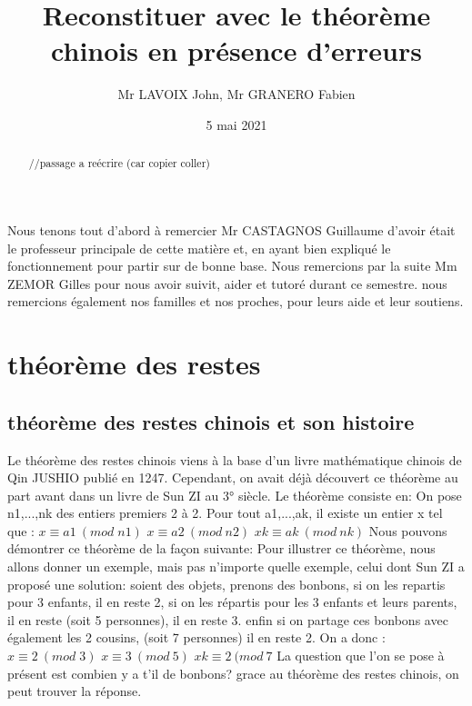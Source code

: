 \documentclass[a4paper, 11pt]{article}
\begin{document}
\title{Reconstituer avec le théorème chinois en présence d’erreurs}
\author{Mr LAVOIX John, Mr GRANERO Fabien }
\date{5 mai 2021}



\begin{abstract}

//passage a reécrire (car copier coller) 
\end{abstract}

\newpage

\tableofcontents

\newpage
\begin{flushleft}
    Nous tenons tout d'abord à remercier Mr CASTAGNOS Guillaume d'avoir était le professeur principale de cette matière et,
en ayant bien expliqué le fonctionnement pour partir sur de bonne base. Nous remercions par la suite Mm ZEMOR Gilles pour nous 
avoir suivit, aider et tutoré durant ce semestre.
\newline 
nous remercions également nos familles et nos proches, pour leurs aide et leur soutiens.
\end{flushleft}

\newpage
\section{théorème des restes}
\subsection{théorème des restes chinois et son histoire}
Le théorème des restes chinois viens à la base d’un livre mathématique chinois de Qin JUSHIO publié en 1247. Cependant, on avait déjà découvert ce théorème au part avant dans un livre de Sun ZI au 3° siècle. Le théorème consiste en:
On pose n1,...,nk des entiers premiers 2 à 2. Pour tout a1,...,ak, il existe un entier x tel que :
\newline
$ x\equiv a1 \: (mod \;  n1)$ 
\newline
$ x\equiv a2 \: (mod \: n2)$
\newline
$ xk \equiv ak \:(mod\: nk)$
\newline
Nous pouvons démontrer ce théorème de la façon suivante:
\newline
\newline
Pour illustrer ce théorème, nous allons donner un exemple, mais pas n'importe quelle exemple, celui dont Sun ZI a proposé une solution:
\newline
soient des objets, prenons des bonbons, si on les repartis pour 3 enfants, il en reste 2, si on les répartis
pour les 3 enfants et leurs parents, il en reste (soit 5 personnes), il en reste 3. enfin si on partage ces bonbons avec également les 2 cousins,
(soit 7 personnes) il en reste 2. On a donc :
\newline 
$ x\equiv 2 \: (mod \;  3)$ 
\newline
$ x\equiv 3 \: (mod \: 5)$
\newline
$ xk \equiv 2 \:(mod\: 7$
\newline
La question que l'on se pose à présent est combien y a t'il de bonbons?
\newline
grace au théorème des restes chinois, on peut trouver la réponse.
\end{document}
